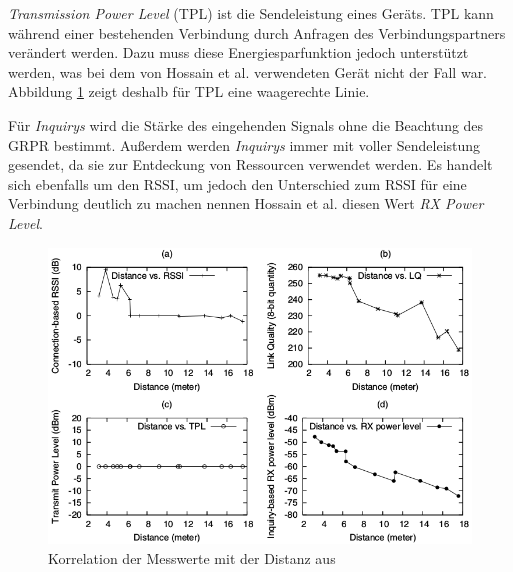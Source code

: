 \emph{Transmission Power Level} (TPL) ist die Sendeleistung eines Geräts. 
TPL kann während einer bestehenden Verbindung durch Anfragen des Verbindungspartners verändert werden.
Dazu muss diese Energiesparfunktion jedoch unterstützt werden, was bei dem von Hossain et al. verwendeten Gerät nicht der Fall war.
Abbildung \ref{fig:bluetoothmess} zeigt deshalb für TPL eine waagerechte Linie.

Für \emph{Inquirys} wird die Stärke des eingehenden Signals ohne die Beachtung des GRPR bestimmt.
Außerdem werden \emph{Inquirys} immer mit voller Sendeleistung gesendet, da sie zur Entdeckung von Ressourcen verwendet werden.
Es handelt sich ebenfalls um den RSSI, um jedoch den Unterschied zum RSSI für eine Verbindung deutlich zu machen nennen Hossain et al. diesen Wert \emph{RX Power Level}.

\begin{figure}[h]
  \centering
	\includegraphics[width=\textwidth]{images/bluetoothmess.png}
  \caption{Korrelation der Messwerte mit der Distanz aus \cite{hossain2007comprehensive}}
  \label{fig:bluetoothmess}
\end{figure}

